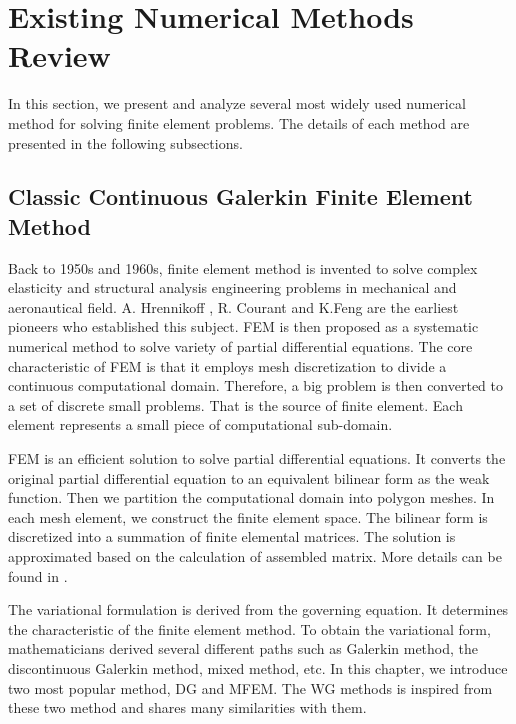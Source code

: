 \section{Existing Numerical Methods Review}
In this section, we present and analyze several most widely used numerical method for solving finite element problems. The details of each method are presented in the following subsections.
 
\subsection{Classic Continuous Galerkin Finite Element Method}
Back to 1950s and 1960s, finite element method is invented to solve complex elasticity and structural analysis engineering problems in mechanical and aeronautical field. A. Hrennikoff \cite{hrennikoff1941solution}, R. Courant \cite{courant1994variational} and K.Feng \cite{babuvska2001finite} are the earliest pioneers who established this subject. FEM is then proposed as a systematic numerical method to solve variety of partial differential equations. The core characteristic of FEM is that it employs mesh discretization to divide a continuous computational domain. Therefore, a big problem is then converted to a set of discrete small problems. That is the source of finite element. Each element represents a small piece of computational sub-domain.

FEM is an efficient solution to solve partial differential equations. It converts the original partial differential equation to an equivalent bilinear form as the weak function. Then we partition the computational domain into polygon meshes. In each mesh element, we construct the finite element space. The bilinear form is discretized into a summation of finite elemental matrices. The solution is approximated based on the calculation of assembled matrix. More details can be found in \cite{zienkiewicz1977finite, ciarlet2002finite, hughes2012finite, reddy1993introduction}.

The variational formulation is derived from the governing equation. It determines the characteristic of the finite element method. To obtain the variational form, mathematicians derived several different paths such as Galerkin method, the discontinuous Galerkin method, mixed method, etc. In this chapter, we introduce two most popular method, DG and MFEM. The WG methods is inspired from these two method and shares many similarities with them. 

